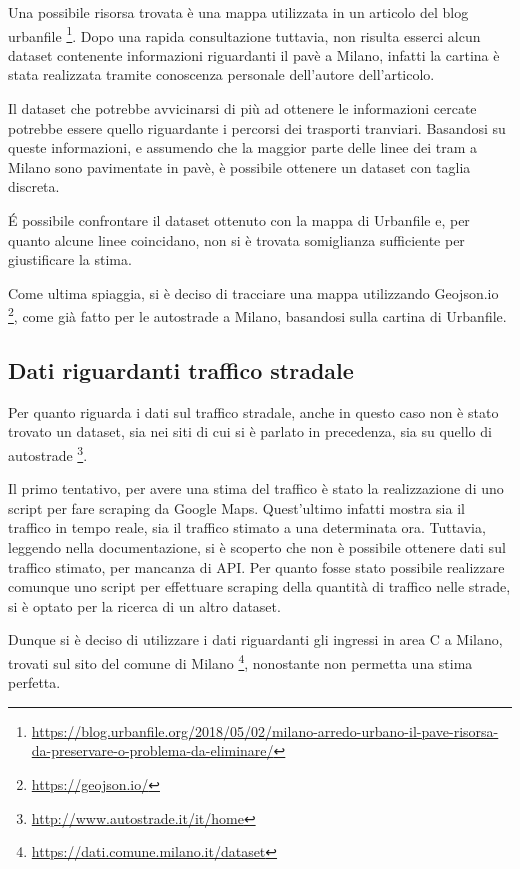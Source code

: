 \documentclass[a4paper]{report}
\begin{document}
Una possibile risorsa trovata è una mappa utilizzata in un articolo del blog urbanfile
\footnote{\url{https://blog.urbanfile.org/2018/05/02/milano-arredo-urbano-il-pave-risorsa-da-preservare-o-problema-da-eliminare/}}.
Dopo una rapida consultazione tuttavia, non risulta esserci alcun dataset contenente informazioni 
riguardanti il pavè a Milano, infatti la cartina è stata realizzata tramite conoscenza personale dell'autore dell'articolo.

Il dataset che potrebbe avvicinarsi di più ad ottenere le informazioni cercate potrebbe essere 
quello riguardante i percorsi dei trasporti tranviari. Basandosi su queste informazioni, e assumendo che 
la maggior parte delle linee dei tram a Milano sono pavimentate in pavè, è possibile ottenere un dataset con taglia discreta.

\'E possibile confrontare il dataset ottenuto con la mappa di Urbanfile e, 
per quanto alcune linee coincidano, non si è trovata somiglianza sufficiente 
per giustificare la stima.

Come ultima spiaggia, si è deciso di tracciare una mappa utilizzando Geojson.io
\footnote{\url{https://geojson.io/}}, come già fatto per le autostrade a Milano, 
basandosi sulla cartina di Urbanfile. 

\subsection{Dati riguardanti traffico stradale}
Per quanto riguarda i dati sul traffico stradale, anche in questo caso non è stato trovato un 
dataset, sia nei siti di cui si è parlato in precedenza, sia su quello di autostrade
\footnote{\url{http://www.autostrade.it/it/home}}.

Il primo tentativo, per avere una stima del traffico è stato la realizzazione di uno script per 
fare scraping da Google Maps. Quest'ultimo infatti mostra sia il traffico in tempo reale, sia 
il traffico stimato a una determinata ora. Tuttavia, leggendo nella documentazione, si è scoperto che 
non è possibile ottenere dati sul traffico stimato, per mancanza di API. 
Per quanto fosse stato possibile realizzare comunque uno script per effettuare scraping della 
quantità di traffico nelle strade, si è optato per la ricerca di un altro dataset.

Dunque si è deciso di utilizzare i dati riguardanti gli ingressi in area C a Milano, 
trovati sul sito del comune di Milano
\footnote{\url{https://dati.comune.milano.it/dataset}}, 
nonostante non permetta una stima perfetta.
\end{document}
